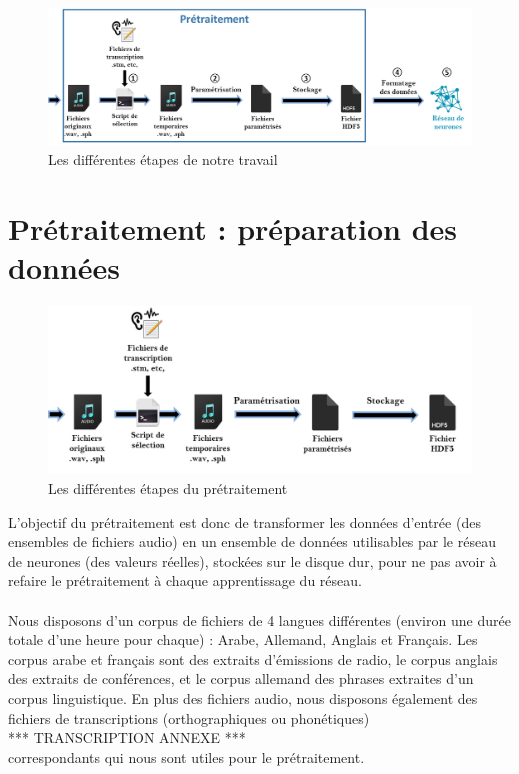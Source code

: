 \documentclass{article}
\begin{document}
\begin{figure}[h]
  \centerline{\includegraphics[scale=0.7]{img/schema_complet.png}}
  \caption{Les différentes étapes de notre travail}
\end{figure}
 
\section{Prétraitement : préparation des données}
\hphantom{.}
\begin{figure}[h]
  \centerline{\includegraphics[scale=0.9]{img/schema_pretraitement.png}}
  \caption{Les différentes étapes du prétraitement}
\end{figure}

L'objectif du prétraitement est donc de transformer les données d'entrée (des ensembles de fichiers audio) en un ensemble de données utilisables par le réseau de neurones (des valeurs réelles), stockées sur le disque dur, pour ne pas avoir à refaire le prétraitement à chaque apprentissage du réseau.\\
 \\
 Nous disposons d'un corpus de fichiers de 4 langues différentes (environ une durée totale d'une heure pour chaque) : Arabe, Allemand, Anglais et Français. Les corpus arabe et français sont des extraits d'émissions de radio, le corpus anglais des extraits de conférences, et le corpus allemand des phrases extraites d'un corpus linguistique. En plus des fichiers audio, nous disposons également des fichiers de transcriptions (orthographiques ou phonétiques)\\
*** TRANSCRIPTION ANNEXE ***\\
correspondants qui nous sont utiles pour le prétraitement.
\end{document}
